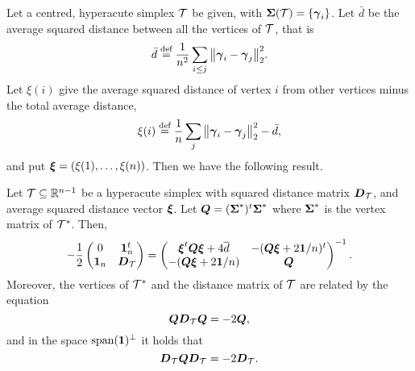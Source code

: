 Let a centred, hyperacute simplex $\mathcal{T}$ be given, with $\boldsymbol{\Sigma}(\mathcal{T})=\{\vb*{\gamma}_i\}$.  Let $\bar{d}$ be the average squared distance between all the vertices of $\mathcal{T}$, that is
\begin{equation}
\label{eq:avg_squared_distance}
\bar{d} \overset{\text{def}}{=}  \frac{1}{n^2}\sum_{i\leq j} \norm{\vb*{\gamma}_i-\vb*{\gamma}_j}_2^2.
\end{equation}
Let $\xi(i)$ give the average squared distance of vertex $i$ from other vertices minus the total average distance, 
\begin{equation}
\label{eq:avg_sqd_distance_i}
\xi(i) \overset{\text{def}}{=} \frac{1}{n}\sum_{j} \norm{\vb*{\gamma}_i-\vb*{\gamma}_j}_2^2 - \bar{d},
\end{equation}
and put $\vb*{\xi}=(\xi(1),\dots,\xi(n))$. 
Then we have the following result. 

\begin{lemma}
	\label{lem:block_inverse_simplex}
	Let $\mathcal{T}\subseteq\mathbb{R}^{n-1}$ be a hyperacute simplex with  squared distance matrix $\vb*{D}_{\mathcal{T}}$, and average squared distance vector $\vb*{\xi}$.
	Let $\vb*{Q}=(\boldsymbol{\Sigma}^*)^t\boldsymbol{\Sigma}^*$  where $\boldsymbol{\Sigma}^*$ is the vertex matrix of $\mathcal{T}^*$.  Then, 
	\begin{equation}
	\label{eq:simplex_block_matrix}
	-\frac{1}{2} \begin{pmatrix}
	0 & \vb{1}_n^t \\ 
	\vb{1}_n &  \vb*{D}_{\mathcal{T}}
	\end{pmatrix} = \begin{pmatrix}
	\vb*{\xi}^t \vb*{Q}\vb*{\xi} + 4\overline{d} & -(\vb*{Q}\vb*{\xi} + 2\vb{1}/n)^t \\
	-(\vb*{Q}\vb*{\xi} + 2\vb{1}/n) & \vb*{Q}
	\end{pmatrix}^{-1}.
	\end{equation}
	Moreover, the vertices of $\mathcal{T}^*$ and the distance matrix of $\mathcal{T}$ are related by the equation
	\begin{equation}
	\label{eq:lem_inverse_relation}
	\vb*{Q} \vb*{D}_{\mathcal{T}} \vb*{Q} = -2\vb*{Q},
	\end{equation}
	and in the space $\textnormal{span}(\vb{1})^\perp$ it holds that 
	\begin{equation*}
	\label{eq:lem_inverse_relation2}
	\vb*{D}_{\mathcal{T}}\vb*{Q} \vb*{D}_{\mathcal{T}}= -2\vb*{D}_{\mathcal{T}}.	
	\end{equation*}
\end{lemma}

